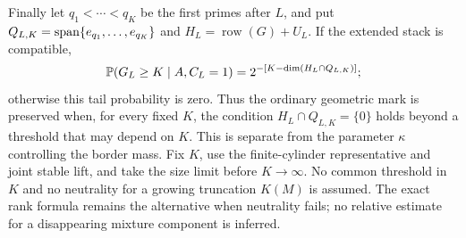 Finally let $q_1<\cdots<q_K$ be the first primes after $L$, and put
$Q_{L,K}=\operatorname{span}\{e_{q_1},\ldots,e_{q_K}\}$ and
$H_L=\operatorname{row}(G)+U_L$. If the extended stack is compatible,
\[
 \mathbb P(G_L\ge K\mid A,C_L=1)
                 =2^{-[K-\dim(H_L\cap Q_{L,K})]};
\]
otherwise this tail probability is zero. Thus the ordinary geometric
mark is preserved when, for every fixed $K$, the condition
$H_L\cap Q_{L,K}=\{0\}$ holds beyond a threshold that may depend on $K$.
This is separate from the parameter $\kappa$ controlling the border mass.
Fix $K$, use the finite-cylinder representative and joint stable lift,
and take the size limit before $K\to\infty$. No common threshold in $K$
and no neutrality for a growing truncation $K(M)$ is assumed.
The exact rank formula remains the alternative when neutrality fails;
no relative estimate for a disappearing mixture component is inferred.

